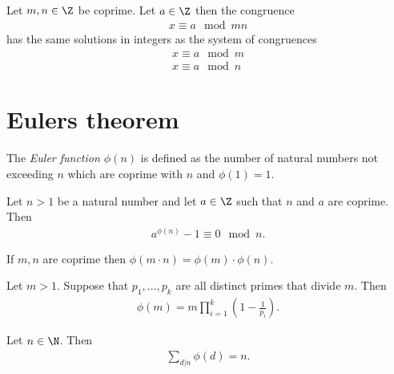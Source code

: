 \documentclass{article}
\begin{document}
\begin{theorem}
    Let $m,n\in\Z$ be coprime. Let $a\in\Z$ then the congruence
    \begin{align*}
        x \equiv a \mod mn
    \end{align*}
    has the same solutions in integers as the system of congruences 
    \begin{align*}
        x \equiv a \mod m\\
        x \equiv a \mod n
    \end{align*}
\end{theorem}

\section{Eulers theorem}

\begin{definition}
    The \emph{Euler function $\phi(n)$} is defined as the number of natural numbers not exceeding 
    $n$ which are coprime with $n$ and $\phi(1)=1$.
\end{definition}

\begin{theorem}[Euler]
    Let $n>1$ be a natural number and let $a\in\Z$ such that $n$ and $a$ are coprime. Then 
    \begin{align*}
        a^{\phi(n)}-1 \equiv 0 \mod n.
    \end{align*} 
\end{theorem}

\begin{theorem}
    If $m,n$ are coprime then $\phi(m\cdot n)=\phi(m)\cdot\phi(n)$.
\end{theorem}

\begin{theorem}
    Let $m>1$. Suppose that $p_1,...,p_k$ are all distinct primes that divide $m$. Then 
    \begin{align*}
        \phi(m) = m\prod_{i=1}^k \left(1-\frac{1}{p_i}\right).
    \end{align*}
\end{theorem}

\begin{theorem}
    Let $n\in\N$. Then 
    \begin{align*}
        \sum_{d|n}\phi(d) = n.
    \end{align*}
\end{theorem}
\end{document}

